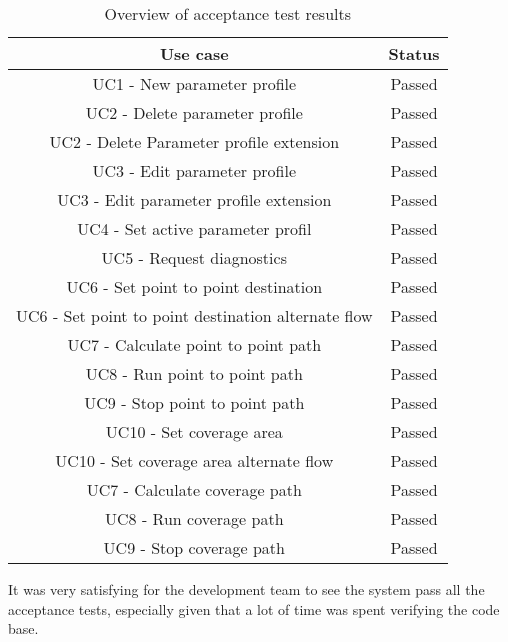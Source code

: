 \begin{table}[H]
\centering
\begin{tabular}{|c|c|}
\hline 
\textbf{Use case} & \textbf{Status}\\ 
\hline 
UC1 - New parameter profile & Passed \\ 
\hline 
UC2 - Delete parameter profile & Passed \\ 
\hline 
UC2 - Delete Parameter profile extension & Passed \\ 
\hline 
UC3 - Edit parameter profile & Passed \\ 
\hline 
UC3 - Edit parameter profile extension & Passed \\ 
\hline 
UC4 - Set active parameter profil & Passed \\ 
\hline 
UC5 - Request diagnostics & Passed \\ 
\hline 
UC6 - Set point to point destination & Passed \\ 
\hline 
UC6 - Set point to point destination alternate flow & Passed \\ 
\hline 
UC7 - Calculate point to point path & Passed \\ 
\hline 
UC8 - Run point to point path & Passed \\ 
\hline 
UC9 - Stop point to point path & Passed \\ 
\hline 
UC10 - Set coverage area & Passed \\ 
\hline 
UC10 - Set coverage area alternate flow & Passed \\ 
\hline 
UC7 - Calculate coverage path & Passed \\ 
\hline 
UC8 - Run coverage path & Passed \\ 
\hline 
UC9 - Stop coverage path & Passed \\ 
\hline 
\end{tabular} 
\caption{Overview of acceptance test results}
\label{table:acceptance_test_results}
\end{table}

It was very satisfying for the development team to see the system pass all the acceptance tests, especially given that a lot of time was spent verifying the code base.
